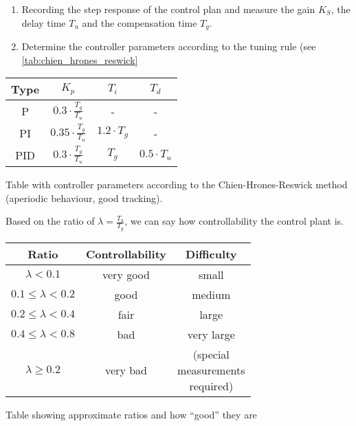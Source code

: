 \begin{enumerate}
    \item Recording the step response of the control plan and measure the gain $K_{S}$, the delay time $T_{u}$ and the compensation time $T_{g}$.
    \item Determine the controller parameters according to the tuning rule (see \ref{tab:chien_hrones_reswick}
\end{enumerate}

\begin{center}
    \begin{threeparttable}
        \begin{tabular}{cccc}
            \toprule
            Type & $K_p$                             &  $T_{i}$            &  $T_{d}$ \\
            \midrule
            P    &  $0.3  \cdot\frac{T_{g}}{T_{u}}$  &  -                  &  -                  \\
            PI   &  $0.35 \cdot\frac{T_{g}}{T_{u}}$  &  $1.2 \cdot T_{g}$  &  -                  \\
            PID  &  $0.3  \cdot\frac{T_{g}}{T_{u}}$  &  $T_{g}$            &  $0.5 \cdot T_{u}$  \\
            \bottomrule
        \end{tabular}
        \caption{Table with controller parameters according to the Chien-Hrones-Reswick method (aperiodic behaviour, good tracking).}
        \label{tab:chien_hrones_reswick}
    \end{threeparttable}
\end{center}

Based  on  the  ratio   of   $\lambda=\frac{T_{u}}{T_{g}}$,  we  can  say  how
controllability the control plant is.

\begin{center}
    \begin{threeparttable}
        \begin{tabular}{ccc}
            \toprule
            Ratio                     &  Controllability  & Difficulty \\
            \midrule
            $\lambda < 0.1$           &  very good        & small  \\ 
            $0.1 \leq \lambda < 0.2$  &  good             & medium  \\ 
            $0.2 \leq \lambda < 0.4$  &  fair             & large  \\ 
            $0.4 \leq \lambda < 0.8$  &  bad              & very large  \\ 
            $ \lambda \geq 0.2$       &  very bad         & \makecell{(special \\ measurements \\ required)}  \\ 
            \bottomrule
        \end{tabular}
        \caption{Table showing approximate ratios and how ``good'' they are}
        \label{tab:controllability}
    \end{threeparttable}
\end{center}

